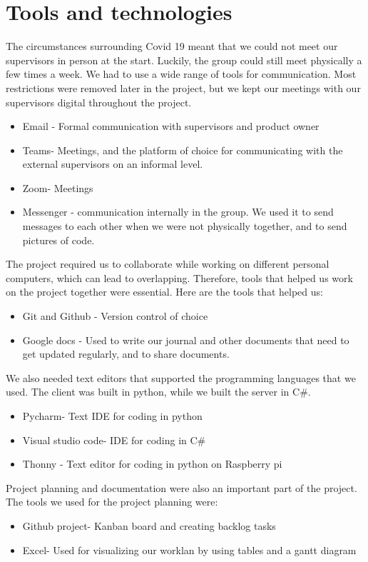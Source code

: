 \section{Tools and technologies}
The circumstances surrounding Covid 19 meant that we could not meet our supervisors in person at the start. Luckily, the group could still meet physically a few times a week. We had to use a wide range of tools for communication. Most restrictions were removed later in the project, but we kept our meetings with our supervisors digital throughout the project. 

\begin{itemize}
	\item Email - Formal communication with supervisors and product owner
	\item Teams- Meetings, and the platform of choice for communicating with the external supervisors on an informal level. 
	\item Zoom- Meetings
	\item Messenger - communication internally in the group. We used it to send messages to each other when we were not physically together, and to send pictures of code. 
\end{itemize}

The project required us to collaborate while working on different personal computers, which can lead to overlapping. Therefore, tools that helped us work on the project together were essential. Here are the tools that helped us:

\begin{itemize}
	\item Git and Github - Version control of choice
	\item Google docs - Used to write our journal and other documents that need to get updated regularly, and to share documents. 
\end{itemize}

We also needed text editors that supported the programming languages that we used. The client was built in python, while we built the server in C\#. 

\begin{itemize}
	\item Pycharm- Text IDE for coding in python
	\item Visual studio code- IDE for coding in C\#
	\item Thonny - Text editor for coding in python on Raspberry pi
\end{itemize}

Project planning and documentation were also an important part of the project. The tools we used for the project planning were:

\begin{itemize}
	\item Github project- Kanban board and creating backlog tasks
	\item Excel- Used for visualizing our worklan by using tables and a gantt diagram
\end{itemize}